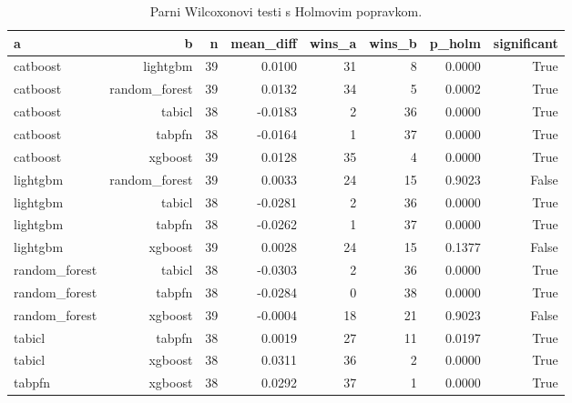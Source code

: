 \begin{table}[htbp]
\centering
\caption{Parni Wilcoxonovi testi s Holmovim popravkom.}
\label{tab:wilcoxon-nonsaturated}
\begin{tabular}{lrrrrrrr}
\hline
a & b & n & mean\_diff & wins\_a & wins\_b & p\_holm & significant \\
\hline
catboost & lightgbm & 39 & 0.0100 & 31 & 8 & 0.0000 & True \\
catboost & random\_forest & 39 & 0.0132 & 34 & 5 & 0.0002 & True \\
catboost & tabicl & 38 & -0.0183 & 2 & 36 & 0.0000 & True \\
catboost & tabpfn & 38 & -0.0164 & 1 & 37 & 0.0000 & True \\
catboost & xgboost & 39 & 0.0128 & 35 & 4 & 0.0000 & True \\
lightgbm & random\_forest & 39 & 0.0033 & 24 & 15 & 0.9023 & False \\
lightgbm & tabicl & 38 & -0.0281 & 2 & 36 & 0.0000 & True \\
lightgbm & tabpfn & 38 & -0.0262 & 1 & 37 & 0.0000 & True \\
lightgbm & xgboost & 39 & 0.0028 & 24 & 15 & 0.1377 & False \\
random\_forest & tabicl & 38 & -0.0303 & 2 & 36 & 0.0000 & True \\
random\_forest & tabpfn & 38 & -0.0284 & 0 & 38 & 0.0000 & True \\
random\_forest & xgboost & 39 & -0.0004 & 18 & 21 & 0.9023 & False \\
tabicl & tabpfn & 38 & 0.0019 & 27 & 11 & 0.0197 & True \\
tabicl & xgboost & 38 & 0.0311 & 36 & 2 & 0.0000 & True \\
tabpfn & xgboost & 38 & 0.0292 & 37 & 1 & 0.0000 & True \\
\hline
\end{tabular}
\end{table}
